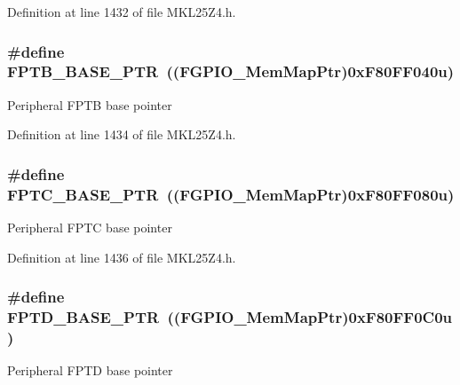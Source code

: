 Definition at line 1432 of file M\+K\+L25\+Z4.\+h.

\subsubsection[{\texorpdfstring{F\+P\+T\+B\+\_\+\+B\+A\+S\+E\+\_\+\+P\+TR}{FPTB_BASE_PTR}}]{\setlength{\rightskip}{0pt plus 5cm}\#define F\+P\+T\+B\+\_\+\+B\+A\+S\+E\+\_\+\+P\+TR~(({\bf F\+G\+P\+I\+O\+\_\+\+Mem\+Map\+Ptr})0x\+F80\+F\+F040u)}\hypertarget{group___f_g_p_i_o___peripheral_ga725ec21a43213bffe0aa484f7406bcf5}{}\label{group___f_g_p_i_o___peripheral_ga725ec21a43213bffe0aa484f7406bcf5}
Peripheral F\+P\+TB base pointer 

Definition at line 1434 of file M\+K\+L25\+Z4.\+h.

\subsubsection[{\texorpdfstring{F\+P\+T\+C\+\_\+\+B\+A\+S\+E\+\_\+\+P\+TR}{FPTC_BASE_PTR}}]{\setlength{\rightskip}{0pt plus 5cm}\#define F\+P\+T\+C\+\_\+\+B\+A\+S\+E\+\_\+\+P\+TR~(({\bf F\+G\+P\+I\+O\+\_\+\+Mem\+Map\+Ptr})0x\+F80\+F\+F080u)}\hypertarget{group___f_g_p_i_o___peripheral_gaed3b8398ebed63795f9ce57eb9a59097}{}\label{group___f_g_p_i_o___peripheral_gaed3b8398ebed63795f9ce57eb9a59097}
Peripheral F\+P\+TC base pointer 

Definition at line 1436 of file M\+K\+L25\+Z4.\+h.

\subsubsection[{\texorpdfstring{F\+P\+T\+D\+\_\+\+B\+A\+S\+E\+\_\+\+P\+TR}{FPTD_BASE_PTR}}]{\setlength{\rightskip}{0pt plus 5cm}\#define F\+P\+T\+D\+\_\+\+B\+A\+S\+E\+\_\+\+P\+TR~(({\bf F\+G\+P\+I\+O\+\_\+\+Mem\+Map\+Ptr})0x\+F80\+F\+F0\+C0u)}\hypertarget{group___f_g_p_i_o___peripheral_gabaff6b055edb9ba703415d0473b92ca8}{}\label{group___f_g_p_i_o___peripheral_gabaff6b055edb9ba703415d0473b92ca8}
Peripheral F\+P\+TD base pointer 

